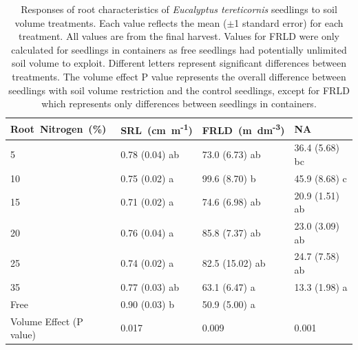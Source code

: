 \documentclass[a4paper]{article}\usepackage[]{graphicx}\usepackage[]{color}
\begin{document}
\begin{table}
\centering
\caption{Responses of root characteristics of \textit{Eucalyptus tereticornis} seedlings to soil volume treatments. Each value reflects the mean ($\pm$1 standard error) for each treatment. All values are from the final harvest. Values for FRLD were only calculated for seedlings in containers as free seedlings had potentially unlimited soil volume to exploit. Different letters represent significant differences between treatments. The volume effect P value represents the overall difference between seedlings with soil volume restriction and the control seedlings, except for FRLD which represents only differences between seedlings in containers.} 
\label{table:Table 2.2}
\begin{tabular}{llll}
  \hline
Root~Nitrogen~(\%) & SRL~(cm~m\textsuperscript{-1}) & FRLD~(m~dm\textsuperscript{-3}) & NA \\ 
  \hline
5 & 0.78 (0.04) ab & 73.0 (6.73) ab & 36.4 (5.68) bc \\ 
  10 & 0.75 (0.02) a & 99.6 (8.70) b & 45.9 (8.68) c \\ 
  15 & 0.71 (0.02) a & 74.6 (6.98) ab & 20.9 (1.51) ab \\ 
  20 & 0.76 (0.04) a & 85.8 (7.37) ab & 23.0 (3.09) ab \\ 
  25 & 0.74 (0.02) a & 82.5 (15.02) ab & 24.7 (7.58) ab \\ 
  35 & 0.77 (0.03) ab & 63.1 (6.47) a & 13.3 (1.98) a \\ 
  Free & 0.90 (0.03) b & 50.9 (5.00) a &  \\ 
   \hline
Volume Effect (P value) & 0.017 & 0.009 & 0.001 \\ 
   \hline
\end{tabular}
\end{table}
\end{document}
